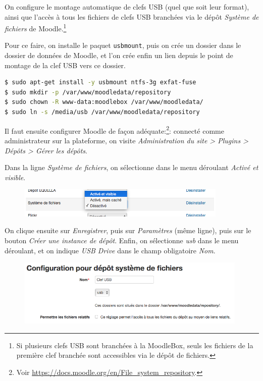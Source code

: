 \documentclass[12pt]{article}
\begin{document}
On configure le montage automatique de clefs USB (quel que soit leur format), ainsi que l'accès à tous les fichiers de clefs USB branchées via le dépôt \emph{Système de fichiers} de Moodle.\footnote{Si plusieurs clefs USB sont branchées à la MoodleBox, seuls les fichiers de la première clef branchée sont accessibles via le dépôt de fichiers.}

Pour ce faire, on installe le paquet \lstinline{usbmount}, puis on crée un dossier dans le dossier de données de Moodle, et l'on crée enfin un lien depuis le point de montage de la clef USB vers ce dossier.

\begin{lstlisting}[language=bash]
$ sudo apt-get install -y usbmount ntfs-3g exfat-fuse
$ sudo mkdir -p /var/www/moodledata/repository
$ sudo chown -R www-data:moodlebox /var/www/moodledata/
$ sudo ln -s /media/usb /var/www/moodledata/repository
\end{lstlisting}

Il faut ensuite configurer Moodle de façon adéquate:\footnote{Voir \url{https://docs.moodle.org/en/File_system_repository}.}: connecté comme administrateur sur la plateforme, on visite \emph{Administration du site > Plugins > Dépôts > Gérer les dépôts}.

Dans la ligne \emph{Système de fichiers}, on sélectionne dans le menu déroulant \emph{Activé et visible}.

\begin{figure}[!ht]
\begin{minipage}[b]{\linewidth}
\centering
\includegraphics[width=10cm]{repo-filesystem-usb-1.png}
\end{minipage}
\end{figure}

On clique ensuite sur \emph{Enregistrer}, puis sur \emph{Paramètres} (même ligne), puis sur le bouton \emph{Créer une instance de dépôt}.
Enfin, on sélectionne \emph{usb} dans le menu déroulant, et on indique \emph{USB Drive} dans le champ obligatoire \emph{Nom}.

\begin{figure}[!ht]
\begin{minipage}[b]{\linewidth}
\centering
\includegraphics[width=11cm]{repo-filesystem-usb-2.png}
\end{minipage}
\end{figure}
\end{document}
